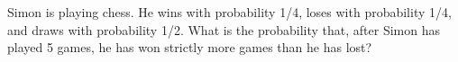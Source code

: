 Simon is playing chess. He wins with probability 1/4, loses with probability 1/4, and draws with probability 1/2. What is the probability that, after Simon has played 5 games, he has won strictly more games than he has lost?